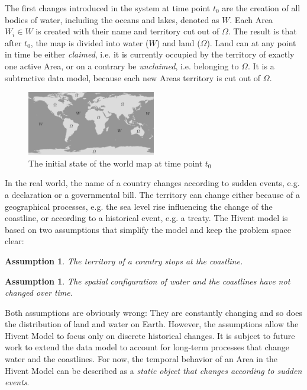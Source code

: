 The first changes introduced in the system at time point $t_0$ are the creation of all bodies of water, including the oceans and lakes, denoted as $W$. Each Area $W_i \in W$ is created with their name and territory cut out of $\Omega$. The result is that after $t_0$, the map is divided into water ($W$) and land ($\Omega$). Land can at any point in time be either \emph{claimed}, i.e. it is currently occupied by the territory of exactly one active Area, or on a contrary be \emph{unclaimed}, i.e. belonging to $\Omega$. It is a subtractive data model, because each new Areas territory is cut out of $\Omega$.

\begin{figure}[H]
  \centering
  \includegraphics[width=0.5\textwidth]{graphics/development/hivent_model/init_map}
  \caption{The initial state of the world map at time point $t_0$}
  \label{fig:init_map}
\end{figure}

In the real world, the name of a country changes according to sudden events, e.g. a declaration or a governmental bill. The territory can change either because of a geographical processes, e.g. the sea level rise influencing the change of the coastline, or according to a historical event, e.g. a treaty. The Hivent model is based on two assumptions that simplify the model and keep the problem space clear:

\vspace{-1.0em}
\newtheorem{coastline_territory}[assicounter]{Assumption}
\begin{coastline_territory}
\label{axm:coastline_territory}
  The territory of a country stops at the coastline.
\end{coastline_territory}

\vspace{-2.0em}
\newtheorem{constant_coastlines}[assicounter]{Assumption}
\begin{constant_coastlines}
\label{axm:constant_coastlines}
  The spatial configuration of water and the coastlines have not changed over time.
\end{constant_coastlines}

Both assumptions are obviously wrong:  They are constantly changing and so does the distribution of land and water on Earth. However, the assumptions allow the Hivent Model to focus only on discrete historical changes. It is subject to future work to extend the data model to account for long-term processes that change water and the coastlines. For now, the temporal behavior of an Area in the Hivent Model can be described as a \emph{static object that changes according to sudden events}.

